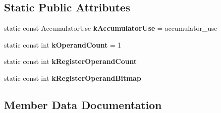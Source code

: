 \subsection*{Static Public Attributes}
\begin{DoxyCompactItemize}
\item 
static const Accumulator\+Use {\bfseries k\+Accumulator\+Use} = accumulator\+\_\+use\hypertarget{structv8_1_1internal_1_1interpreter_1_1_bytecode_traits_3_01accumulator__use_00_01operand__0_01_4_a1e864601d1128c8f3ec68470e23692bc}{}\label{structv8_1_1internal_1_1interpreter_1_1_bytecode_traits_3_01accumulator__use_00_01operand__0_01_4_a1e864601d1128c8f3ec68470e23692bc}

\item 
static const int {\bfseries k\+Operand\+Count} = 1\hypertarget{structv8_1_1internal_1_1interpreter_1_1_bytecode_traits_3_01accumulator__use_00_01operand__0_01_4_ad75f52cc0eb41e52a08613c74c643f35}{}\label{structv8_1_1internal_1_1interpreter_1_1_bytecode_traits_3_01accumulator__use_00_01operand__0_01_4_ad75f52cc0eb41e52a08613c74c643f35}

\item 
static const int {\bfseries k\+Register\+Operand\+Count}
\item 
static const int {\bfseries k\+Register\+Operand\+Bitmap}
\end{DoxyCompactItemize}


\subsection{Member Data Documentation}
